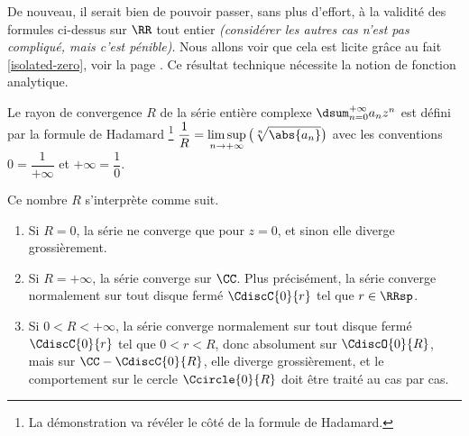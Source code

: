 De nouveau, il serait bien de pouvoir passer, sans plus d'effort, à la validité des formules ci-dessus sur $\RR$ tout entier \emph{(considérer les autres cas n'est pas compliqué, mais c'est pénible)}.
%
Nous allons voir que cela est licite grâce au fait \ref{isolated-zero}, voir la page \pageref{isolated-zero}. Ce résultat technique nécessite la notion de fonction analytique.




\begin{preli} \label{conv-ray}
    Le rayon de convergence $R$ de la série entière complexe $\dsum_{n=0}^{+\infty} a_n z^n$ est défini par la formule de Hadamard%
    \footnote{
    	La démonstration va révéler le côté  de la formule de Hadamard.
    }
    $\displaystyle \frac{1}{R} = \limsup_{n \to +\infty} \big( \sqrt[n]{\abs{a_n}} \big)$
    avec les conventions
    $0 = \dfrac{1}{+\infty}$
    et
    $+\infty = \dfrac{1}{0}$.

    \smallskip
    
    Ce nombre $R$ s'interprète comme suit.
    \begin{enumerate}
        \item Si $R = 0$, la série ne converge que pour $z = 0$, et sinon elle diverge grossièrement.

        \item Si $R = +\infty$, la série converge sur $\CC$.
        Plus précisément, la série converge normalement sur tout disque fermé $\CdiscC{0}{r}$ tel que $r \in \RRsp$. 

        \item Si $0 < R < +\infty$, la série converge normalement sur tout disque fermé $\CdiscC{0}{r}$ tel que $0 < r < R$,
        donc absolument sur $\CdiscO{0}{R}$,
        mais sur $\CC - \CdiscC{0}{R}$, elle diverge grossièrement,
        et
        le comportement sur le cercle $\Ccircle{0}{R}$ doit être traité au cas par cas.
    \end{enumerate}
\end{preli}



